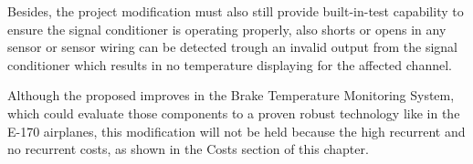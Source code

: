 Besides, the project modification must also still provide built-in-test capability to ensure the signal conditioner is operating properly, also shorts or opens in any sensor or sensor wiring can be detected trough an invalid output from the signal conditioner which results in no temperature displaying for the affected channel.

Although the proposed improves in the Brake Temperature Monitoring System, which could evaluate those components to a proven robust technology like in the E-170 airplanes, this modification will not be held because the high recurrent and no recurrent costs, as shown in the Costs section of this chapter.

